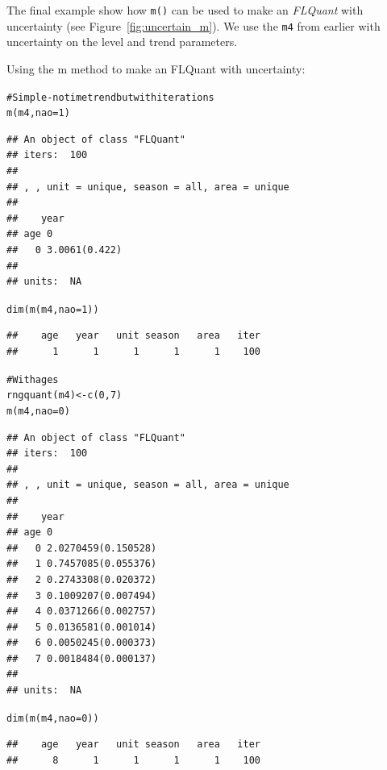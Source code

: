 \documentclass[a4paper,english,10pt]{article}\usepackage[]{graphicx}\usepackage[]{color}
\makeatletter
\newcommand{\hlnum}[1]{\textcolor[rgb]{0.2,0.2,0.2}{#1}}%
\newcommand{\hlcom}[1]{\textcolor[rgb]{0.2,0.267,0.4}{#1}}%
\newcommand{\hlstd}[1]{\textcolor[rgb]{0,0,0}{#1}}%
\newcommand{\hlkwb}[1]{\textcolor[rgb]{0.361,0.506,0.596}{#1}}%
\newcommand{\hlkwc}[1]{\textcolor[rgb]{0.361,0.506,0.596}{#1}}%
\newcommand{\hlkwd}[1]{\textcolor[rgb]{0.361,0.506,0.596}{#1}}%
\newenvironment{kframe}{%
 \def\at@end@of@kframe{}%
 \ifinner\ifhmode%
  \def\at@end@of@kframe{\end{minipage}}%
  \begin{minipage}{\columnwidth}%
 \fi\fi%
 \def\FrameCommand##1{\hskip\@totalleftmargin \hskip-\fboxsep
 \colorbox{shadecolor}{##1}\hskip-\fboxsep
     \hskip-\linewidth \hskip-\@totalleftmargin \hskip\columnwidth}%
 \MakeFramed {\advance\hsize-\width
   \@totalleftmargin\z@ \linewidth\hsize
   \@setminipage}}%
 {\par\unskip\endMakeFramed%
 \at@end@of@kframe}
\newenvironment{knitrout}{}{} %
\newcommand{\code}[1]{{\texttt{#1}}}
\newcommand{\class}[1]{{\textit{#1}}}
\makeatother
\begin{document}
The final example show how \code{m()} can be used to make an \class{FLQuant} with uncertainty (see Figure~\ref{fig:uncertain_m}). We use the \code{m4} from earlier with uncertainty on the level and trend parameters.

Using the m method to make an FLQuant with uncertainty:

\begin{knitrout}
\color{fgcolor}\begin{kframe}
\begin{alltt}
\hlcom{# Simple - no time trend but with iterations}
\hlkwd{m}\hlstd{(m4,} \hlkwc{nao} \hlstd{=} \hlnum{1}\hlstd{)}
\end{alltt}
\begin{verbatim}
## An object of class "FLQuant"
## iters:  100 
## 
## , , unit = unique, season = all, area = unique
## 
##    year
## age 0            
##   0 3.0061(0.422)
## 
## units:  NA
\end{verbatim}
\begin{alltt}
\hlkwd{dim}\hlstd{(}\hlkwd{m}\hlstd{(m4,} \hlkwc{nao} \hlstd{=} \hlnum{1}\hlstd{))}
\end{alltt}
\begin{verbatim}
##    age   year   unit season   area   iter 
##      1      1      1      1      1    100
\end{verbatim}
\begin{alltt}
\hlcom{# With ages}
\hlkwd{rngquant}\hlstd{(m4)} \hlkwb{<-} \hlkwd{c}\hlstd{(}\hlnum{0}\hlstd{,} \hlnum{7}\hlstd{)}
\hlkwd{m}\hlstd{(m4,} \hlkwc{nao} \hlstd{=} \hlnum{0}\hlstd{)}
\end{alltt}
\begin{verbatim}
## An object of class "FLQuant"
## iters:  100 
## 
## , , unit = unique, season = all, area = unique
## 
##    year
## age 0                  
##   0 2.0270459(0.150528)
##   1 0.7457085(0.055376)
##   2 0.2743308(0.020372)
##   3 0.1009207(0.007494)
##   4 0.0371266(0.002757)
##   5 0.0136581(0.001014)
##   6 0.0050245(0.000373)
##   7 0.0018484(0.000137)
## 
## units:  NA
\end{verbatim}
\begin{alltt}
\hlkwd{dim}\hlstd{(}\hlkwd{m}\hlstd{(m4,} \hlkwc{nao} \hlstd{=} \hlnum{0}\hlstd{))}
\end{alltt}
\begin{verbatim}
##    age   year   unit season   area   iter 
##      8      1      1      1      1    100
\end{verbatim}

\end{kframe}
\end{knitrout}
\end{document}
